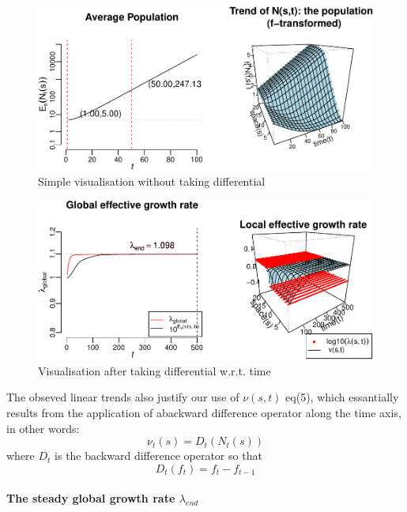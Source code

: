 \documentclass[a4paperpaper,]{article}
\let\oldparagraph\paragraph
\renewcommand{\paragraph}[1]{\oldparagraph{#1}\mbox{}}
\begin{document}
\begin{figure}
\centering
\includegraphics{index_files/figure-latex/DMB_log-1.pdf}
\caption{\label{fig:DMB_log} Simple visualisation without taking
differential}
\end{figure}

\begin{figure}
\centering
\includegraphics{index_files/figure-latex/DMB_logdiff-1.pdf}
\caption{\label{fig:DMB_logdiff} Visualisation after taking differential
w.r.t. time}
\end{figure}

The obseved linear trends also justify our use of \(\nu(s,t)\) eq(5),
which essantially results from the application of abackward difference
operator along the time axis, in other words: \[
\nu_t(s) = D_t(N_t(s))
\] where \(D_t\) is the backward difference operator so that \[
D_t(f_t)=f_{t}-f_{t-1}
\]

\paragraph{\texorpdfstring{The steady global growth rate
\(\lambda_{end}\)}{The steady global growth rate \textbackslash{}lambda\_\{end\}}}\label{the-steady-global-growth-rate-lambda_end}

\newcommand{\lend}{1.098}
\end{document}
